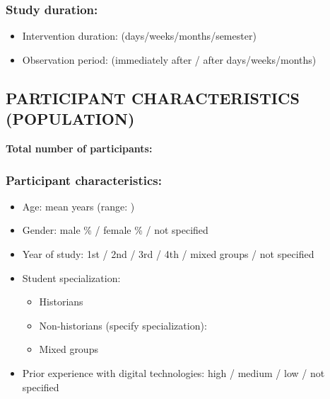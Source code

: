 \documentclass[
hf,
]{ceurart}
\begin{document}
\subsubsection*{Study duration:}
\begin{itemize}
    \item Intervention duration: \underline{\hspace{3cm}} (days/weeks/months/semester)
    \item Observation period: \underline{\hspace{3cm}} (immediately after / after \underline{\hspace{2cm}} days/weeks/months)
\end{itemize}

\subsection*{PARTICIPANT CHARACTERISTICS (POPULATION)}

\noindent\textbf{Total number of participants:} \underline{\hspace{3cm}}

\subsubsection*{Participant characteristics:}
\begin{itemize}
    \item Age: mean \underline{\hspace{2cm}} years (range: \underline{\hspace{2cm}})
    \item Gender: male \underline{\hspace{1cm}}\% / female \underline{\hspace{1cm}}\% / not specified
    \item Year of study: 1st / 2nd / 3rd / 4th / mixed groups / not specified
    \item Student specialization:
    \begin{itemize}[label=$\square$]
        \item Historians
        \item Non-historians (specify specialization): \underline{\hspace{3cm}}
        \item Mixed groups
    \end{itemize}
    \item Prior experience with digital technologies: high / medium / low / not specified
\end{itemize}
\end{document}
